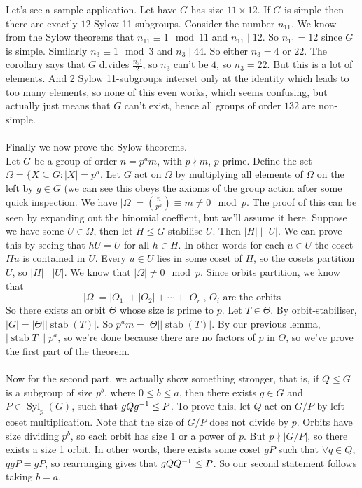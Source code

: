 \documentclass{article}
\DeclareMathOperator{\stab}{stab}
\DeclareMathOperator{\syl}{Syl}
\begin{document}
\begin{itemize}
Let's see a sample application. Let have $ G $ has size $ 11\times 12 $. If $ G $ is simple then there are exactly $ 12 $ Sylow 11-subgroups. Consider the number $ n_{11} $. We know from the Sylow theorems that $ n_{11}\equiv 1\mod 11 $ and $ n_{11}\mid 12 $. So $ n_{11} = 12 $ since $ G $ is simple. Similarly $ n_3\equiv 1 \mod 3 $ and $ n_3\mid 44 $. So either $ n_3 = 4 $ or $ 22 $. The corollary says that $ G $ divides $ \frac{n_3!}2 $, so $ n_3 $ can't be $ 4 $, so $ n_3=22 $. But this is a lot of elements. And 2 Sylow 11-subgroups interset only at the identity which leads to too many elements, so none of this even works, which seems confusing, but actually just means that $ G $ can't exist, hence all groups of order $ 132 $ are non-simple.\\\\
Finally we now prove the Sylow theorems.\\
\pf Let $ G $ be a group of order $ n=p^am $, with $ p\nmid m $, $ p $ prime. Define the set $ \Omega=\{X\subseteq G : |X|=p^a $. Let $ G $ act on $ \Omega $ by multiplying all elements of $ \Omega $ on the left by $ g\in G $ (we can see this obeys the axioms of the group action after some quick inspection. We have $ |\Omega|= \binom{n}{p^a}\equiv m\ne 0\mod p $. The proof of this can be seen by expanding out the binomial coeffient, but we'll assume it here. Suppose we have some $ U\in\Omega $, then let $ H\le G $ stabilise $ U $. Then $ |H|\mid |U| $. We can prove this by seeing that $ hU=U $ for all $ h\in H $. In other words for each $ u\in U $ the coset $ Hu $ is contained in $ U $. Every $ u\in U $ lies in some coset of $ H $, so the cosets partition $ U $, so $ |H|\mid |U| $. We know that $ |\Omega|\ne 0\mod p $. Since orbits partition, we know that
	\[
		|\Omega|=|O_1|+|O_2|+\cdots +|O_r|\text{, } O_i \text{ are the orbits}
	\]
So there exists an orbit $ \Theta $ whose size is prime to $ p $.
Let $ T\in\Theta $. By orbit-stabiliser, $ |G|=|\Theta||\stab(T)| $. So $ p^am=|\Theta||\stab(T)| $. By our previous lemma, $ |\stab T|\mid p^a $, so we're done because there are no factors of $ p $ in $ \Theta $, so we've prove the first part of the theorem.\\\\
Now for the second part, we actually show something stronger, that is, if $ Q\le G $ is a subgroup of size $ p^b $, where $ 0\le b\le a $, then there exists $ g\in G $ and $ P\in \syl_p(G) $, such that $ gQ{g}^{-1}\le P $. To prove this, let $ Q $ act on $ G/P $ by left coset multiplication. Note that the size of $ G/P $ does not divide by $ p $. Orbits have size dividing $ p^b $, so each orbit has size $ 1 $ or a power of $ p $. But $ p\nmid |G/P| $, so there exists a size 1 orbit. In other words, there exists some coset $ gP $ such that $ \forall q\in Q $, $ qgP=gP $, so rearranging gives that $ gQ{Q}^{-1}\le P $. So our second statement follows taking $ b=a $.\\\\

\end{itemize}
\end{document}
